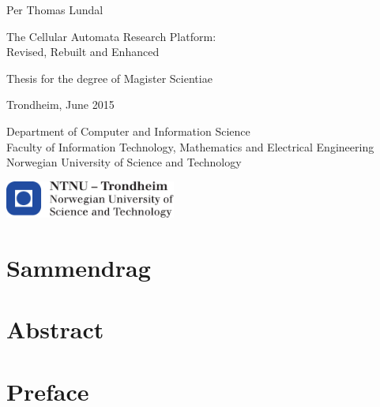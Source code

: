 \documentclass[a4paper,twoside,12pt]{book}
\begin{document}
\begin{titlepage}
\large
Per Thomas Lundal

\vspace{2cm}

\huge
The Cellular Automata Research Platform:\\
Revised, Rebuilt and Enhanced

\vspace{2cm}

\normalsize
Thesis for the degree of Magister Scientiae

\vspace{1cm}

Trondheim, June 2015

\vspace{1cm}

Department of Computer and Information Science \\
Faculty of Information Technology, Mathematics and Electrical Engineering \\
Norwegian University of Science and Technology \\

\vfill

\center
\includegraphics[width=0.42\textwidth]{ntnu}

\end{titlepage}

\clearpage
\null
{}
\newpage


\cleardoublepage
{}
{}
\chapter*{Sammendrag}
    

\cleardoublepage
{}
{}
\chapter*{Abstract}
    

\cleardoublepage
{}
{}
\chapter*{Preface}
    
\end{document}

